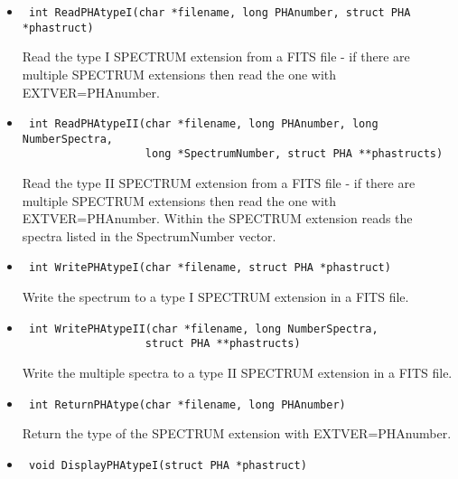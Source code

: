 \documentclass[11pt]{book}
\begin{document}
\begin{itemize}

\item      \begin{verbatim} int ReadPHAtypeI(char *filename, long PHAnumber, struct PHA *phastruct)\end{verbatim}

               Read the type I SPECTRUM extension from a FITS file -
               if there are multiple SPECTRUM extensions then read the
               one with EXTVER=PHAnumber.

\item      \begin{verbatim} int ReadPHAtypeII(char *filename, long PHAnumber, long NumberSpectra,
                   long *SpectrumNumber, struct PHA **phastructs)\end{verbatim}

               Read the type II SPECTRUM extension from a FITS file - 
               if there are multiple SPECTRUM extensions then read the
               one with EXTVER=PHAnumber. Within the SPECTRUM extension reads the
               spectra listed in the SpectrumNumber vector.

\item      \begin{verbatim} int WritePHAtypeI(char *filename, struct PHA *phastruct)\end{verbatim}

               Write the spectrum to a type I SPECTRUM extension in a FITS file.

\item      \begin{verbatim} int WritePHAtypeII(char *filename, long NumberSpectra, 
                   struct PHA **phastructs)\end{verbatim}

               Write the multiple spectra to a type II SPECTRUM
               extension in a FITS file.

\item      \begin{verbatim} int ReturnPHAtype(char *filename, long PHAnumber)\end{verbatim}

               Return the type of the SPECTRUM extension with EXTVER=PHAnumber.

\item      \begin{verbatim} void DisplayPHAtypeI(struct PHA *phastruct)\end{verbatim}


\end{itemize}
\end{document}
